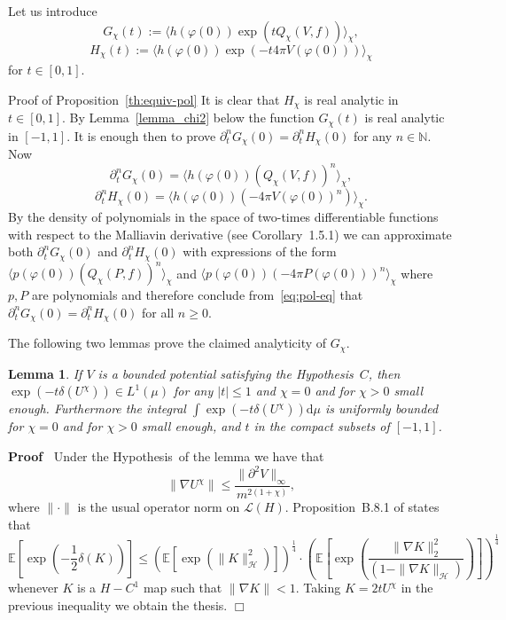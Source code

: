 \documentclass[a4paper,10pt]{article}
\newcommand{\assign}{:=}
\newcommand{\mathd}{\mathrm{d}}
\newenvironment{proof}{\noindent\textbf{Proof\ }}{\hspace*{\fill}$\Box$\medskip}
\newenvironment{proof*}[1]{\noindent\textbf{#1\ }}{\hspace*{\fill}$\Box$\medskip}
\newtheorem{lemma}[theorem]{Lemma}
\begin{document}
Let us introduce
\[ G_{\chi} (t) \assign \langle h (\varphi (0)) \exp (t Q_{\chi} (V, f))
   \rangle_{\chi}, \]
\[ H_{\chi} (t) \assign \langle h (\varphi (0)) \exp (- t 4 \pi V (\varphi
   (0))) \rangle_{\chi} \]
for $t \in [0, 1]$.

\begin{proof*}{Proof of Proposition~\ref{th:equiv-pol}}
  It is clear that $H_{\chi}$ is real analytic in $t \in [0, 1]$. By
  Lemma~\ref{lemma_chi2} below the function $G_{\chi} (t)$ is real analytic in
  $[- 1, 1]$. It is enough then to prove $\partial^n_t G_{\chi} (0) =
  \partial^n_t H_{\chi} (0)$ for any $n \in \mathbb{N}$. Now
  \[ \partial^n_t G_{\chi} (0) = \langle h (\varphi (0)) (Q_{\chi} (V, f))^n
     \rangle_{\chi}, \]
  \[ \partial^n_t H_{\chi} (0) = \langle h (\varphi (0)) (- 4 \pi V (\varphi
     (0))^n) \rangle_{\chi} . \]
  By the density of polynomials in the space of two-times differentiable
  functions with respect to the Malliavin derivative (see {\cite{Nualart2006}}
  Corollary~1.5.1) we can approximate both $\partial^n_t G_{\chi} (0)$ and
  $\partial^n_t H_{\chi} (0)$ with expressions of the form $\langle p (\varphi
  (0)) (Q_{\chi} (P, f))^n \rangle_{\chi}$ and $\langle p (\varphi (0)) (- 4
  \pi P (\varphi (0)))^n \rangle_{\chi}$ where $p, P$ are polynomials and
  therefore conclude from~{\eqref{eq:pol-eq}} that $\partial^n_t G_{\chi} (0)
  = \partial^n_t H_{\chi} (0)$ for all $n \geqslant 0$.
\end{proof*}

The following two lemmas prove the claimed analyticity of $G_{\chi}$.

\begin{lemma}
  \label{lemma_chi1}If $V$ is a bounded potential satisfying the
  Hypothesis~$C$, then $\exp (- t \delta (U^{\chi})) \in L^1 (\mu)$ for any $|
  t | \leqslant 1$ and $\chi=0$ and for $\chi > 0 $ small enough. Furthermore the integral $\int \exp
  (- t \delta (U^{\chi})) \mathd \mu$ is uniformly bounded for $\chi=0$ and for $\chi >0$ small enough, and $t$ in the compact subsets of $[- 1, 1]$.
\end{lemma}

\begin{proof}
  Under the Hypothesis~of the lemma we have that
  \[ \| \nabla U^{\chi} \| \leqslant \frac{\| \partial^2 V \|_{\infty}}{m^{2
     (1 + \chi)}}, \]
  where $\| \cdot \|$ is the usual operator norm on $\mathcal{L} (H)$.
  Proposition~B.8.1 of {\cite{Ustunel2000}} states that
  \[ \mathbb{E} \left[ \exp \left( - \frac{1}{2} \delta (K) \right) \right]
     \leqslant (\mathbb{E} [\exp (\| K \|^2_{\mathcal{H}})])^{\frac{1}{4}}
     \cdot \left( \mathbb{E} \left[ \exp \left( \frac{\| \nabla K \|^2_2}{(1 -
     \| \nabla K \|_{\mathcal{H}})} \right) \right] \right)^{\frac{1}{4}} \]
  whenever $K$ is a $H - C^1$ map such that $\| \nabla K \| < 1$. Taking $K =
  2 t U^{\chi}$ in the previous inequality we obtain the thesis.
\end{proof}
\end{document}
